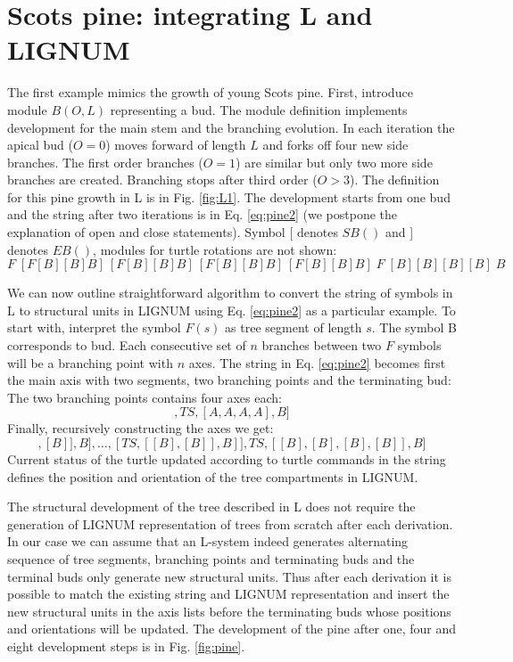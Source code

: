 \section{Scots pine: integrating L and LIGNUM}\label{sec:pine}
The  first example  mimics the  growth  of young  Scots pine.   First,
introduce module  $B(O,L)$ representing a bud.   The module definition
implements development for the  main stem and the branching evolution.
In each iteration the apical bud ($O = 0$) moves forward of length $L$
and forks off four new side  branches.  The first order branches ($O =
1$)  are  similar  but  only  two  more  side  branches  are  created.
Branching stops after third order  ($O > 3$).  The definition for this
pine growth in L is in Fig.  \ref{fig:L1}. The development starts from
one bud and  the string after two iterations  is in Eq. \ref{eq:pine2}
(we postpone the  explanation of open and close  statements). Symbol [
denotes $SB()$ and ] denotes  $EB()$, modules for turtle rotations are
not shown:
\begin{equation}\label{eq:pine2}
F\;[F[B][B]B]\:[F[B][B]B]\:[F[B][B]B]\:[F[B][B]B]\; F \;[B][B][B][B]\; B
\end{equation}

We can now outline straightforward  algorithm to convert the string of
symbols in L to structural units in LIGNUM using Eq. \ref{eq:pine2} as
a particular example.   To start with, interpret the  symbol $F(s)$ as
tree segment  of length $s$.  The  symbol B corresponds  to bud.  Each
consecutive  set of $n$  branches between  two $F$  symbols will  be a
branching  point with  $n$ axes.   The string  in  Eq.  \ref{eq:pine2}
becomes first  the main axis  with two segments, two  branching points
and the terminating bud:
\begin{equation}
[TS, BP, TS, BP, B]
\end{equation}
The two branching points contains four axes each:
\begin{equation}
[TS, [A,A,A,A], TS, [A,A,A,A], B]
\end{equation}
Finally, recursively constructing the axes we get:
\begin{equation}
[TS, [TS,[[B],[B]],B],\ldots, [TS,[[B],[B]],B]], TS, [[B],[B],[B],[B]], B]
\end{equation}
Current status of  the turtle updated according to  turtle commands in
the  string   defines  the  position  and  orientation   of  the  tree
compartments in LIGNUM.

The structural development of the tree described in L does not require
the generation  of LIGNUM representation  of trees from  scratch after
each derivation.   In our case we  can assume that  an L-system indeed
generates alternating sequence of  tree segments, branching points and
terminating buds  and the terminal  buds only generate  new structural
units.   Thus  after each  derivation  it  is  possible to  match  the
existing  string   and  LIGNUM  representation  and   insert  the  new
structural units in  the axis lists before the  terminating buds whose
positions and  orientations will be  updated.  The development  of the
pine  after  one,  four  and   eight  development  steps  is  in  Fig.
\ref{fig:pine}.



